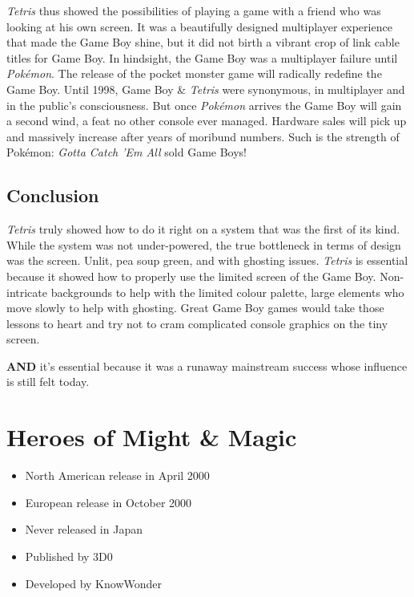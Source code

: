 \documentclass{book}
\begin{document}
\emph{Tetris} thus showed the possibilities of playing a game with a friend who was looking at his own screen. It was a beautifully designed multiplayer experience that made the Game Boy shine, but it did not birth a vibrant crop of link cable titles for Game Boy. In hindsight, the Game Boy was a multiplayer failure until \emph{Pokémon}. The release of the pocket monster game will radically redefine the Game Boy. Until 1998, Game Boy \& \emph{Tetris} were synonymous, in multiplayer and in the public’s consciousness. But once \emph{Pokémon} arrives the Game Boy will gain a second wind, a feat no other console ever managed. Hardware sales will pick up and massively increase after years of moribund numbers. Such is the strength of Pokémon: \emph{Gotta Catch ’Em All} sold Game Boys!

\FloatBarrier\needspace{5pt}\section*{Conclusion}\nopagebreak[4]

\emph{Tetris} truly showed how to do it right on a system that was the first of its kind. While the system was not under-powered, the true bottleneck in terms of design was the screen. Unlit, pea soup green, and with ghosting issues. \emph{Tetris} is essential because it showed how to properly use the limited screen of the Game Boy. Non-intricate backgrounds to help with the limited colour palette, large elements who move slowly to help with ghosting. Great Game Boy games would take those lessons to heart and try not to cram complicated console graphics on the tiny screen.

\textbf{AND} it’s essential because it was a runaway mainstream success whose influence is still felt today.


\begingroup \chapter*{Heroes of Might \& Magic} \endgroup

\begin{itemize} \setlength\itemsep{-0.4em}
\item North American release in April 2000
\item European release in October 2000
\item Never released in Japan
\item Published by 3D0
\item Developed by KnowWonder
\end{itemize}\noindent
\end{document}
